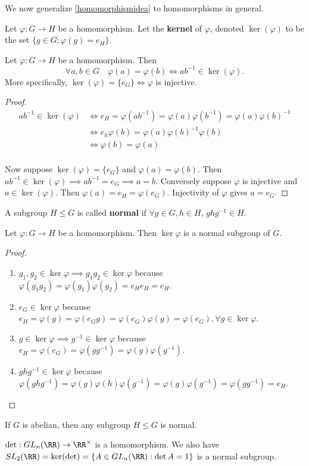 We now generalize \ref{homomorphismidea} to homomorphisms in general.

\begin{df}
Let $\varphi : G \to H$ be a homomorphism. Let the \textbf{kernel} of
$\varphi$, denoted $\ker(\varphi)$ to be the set $\lbrace g \in G :
\varphi(g) = e_H \rbrace$.
\end{df}

\begin{prop}
Let $\varphi : G \to H$ be a homomorphism. Then
\[ \forall a, b \in G \quad \varphi(a) = \varphi(b) \iff ab^{-1} \in
\ker(\varphi). \]
More specifically, $\ker(\varphi) = \lbrace e_G \rbrace \iff \varphi$ is
injective.
\end{prop}

\begin{proof}
\[ \begin{aligned}
ab^{-1} \in \ker(\varphi) &\iff e_H = \varphi(ab^{-1}) = \varphi(a)
\varphi(b^{-1}) = \varphi(a) \varphi(b)^{-1} \\ &\iff e_h \varphi(b) =
\varphi(a) \varphi(b)^{-1} \varphi(b) \\
&\iff \varphi(b) = \varphi(a) \\
\end{aligned} \]

Now suppose $\ker(\varphi) = \lbrace e_G \rbrace$ and $\varphi(a) =
\varphi(b)$. Then $ab^{-1} \in \ker(\varphi) \implies ab^{-1} = e_G
\implies a = b$. Conversely suppose $\varphi$ is injective and $a \in
\ker(\varphi)$. Then $\varphi(a) = e_H = \varphi(e_G)$. Injectivity of
$\varphi$ gives $a = e_G$.
\end{proof}

\begin{df}
A subgroup $H \leq G$ is called \textbf{normal} if $\forall g \in G, h
\in H$, $ghg^{-1} \in H$.
\end{df}

\begin{prop}
Let $\varphi : G \to H$ be a homomorphism. Then $\ker \varphi$ is a
normal subgroup of $G$.
\end{prop}

\begin{proof}
$ $
\begin{enumerate}
\item $g_1, g_2 \in \ker \varphi \implies g_1 g_2 \in \ker \varphi$ because
$\varphi(g_1 g_2) = \varphi(g_1) \varphi(g_2) = e_H e_H = e_H$.
\item $e_G \in \ker \varphi$ because $e_H = \varphi(g) = \varphi(e_G g)
= \varphi(e_G) \varphi(g) = \varphi(e_G), \forall g \in \ker \varphi$.
\item $g \in \ker \varphi \implies g^{-1} \in \ker \varphi$ because $e_H
= \varphi(e_G) = \varphi(g g^{-1}) = \varphi(g) \varphi(g^{-1})$.
\item $ghg^{-1} \in \ker \varphi$ because $\varphi(ghg^{-1}) =
\varphi(g) \varphi(h) \varphi(g^{-1}) = \varphi(g) \varphi(g^{-1}) =
\varphi(gg^{-1}) = e_H$.
\end{enumerate}
\end{proof}

\begin{rem}
If $G$ is abelian, then any subgroup $H \leq G$ is normal.
\end{rem}

\begin{ex}
$\det : GL_n(\RR) \to \RR^\times$ is a homomorphism. We also have
$SL_2(\RR) = \ker(\det) = \lbrace A \in GL_n(\RR) : \det A = 1 \rbrace$
is a normal subgroup.
\end{ex}
